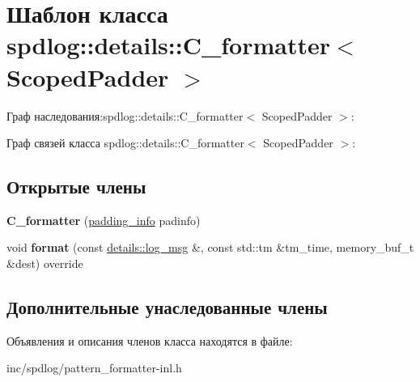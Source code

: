 \hypertarget{classspdlog_1_1details_1_1C__formatter}{}\section{Шаблон класса spdlog\+:\+:details\+:\+:C\+\_\+formatter$<$ Scoped\+Padder $>$}
\label{classspdlog_1_1details_1_1C__formatter}


Граф наследования\+:spdlog\+:\+:details\+:\+:C\+\_\+formatter$<$ Scoped\+Padder $>$\+:


Граф связей класса spdlog\+:\+:details\+:\+:C\+\_\+formatter$<$ Scoped\+Padder $>$\+:
\subsection*{Открытые члены}
\begin{DoxyCompactItemize}
\item 
\mbox{\label{classspdlog_1_1details_1_1C__formatter_a250be4952f5c2db04edda3e380d9bd1b}} 
{\bfseries C\+\_\+formatter} (\hyperlink{structspdlog_1_1details_1_1padding__info}{padding\+\_\+info} padinfo)
\item 
\mbox{\label{classspdlog_1_1details_1_1C__formatter_a0ada263f6e78da633eeb38ffa4681413}} 
void {\bfseries format} (const \hyperlink{structspdlog_1_1details_1_1log__msg}{details\+::log\+\_\+msg} \&, const std\+::tm \&tm\+\_\+time, memory\+\_\+buf\+\_\+t \&dest) override
\end{DoxyCompactItemize}
\subsection*{Дополнительные унаследованные члены}


Объявления и описания членов класса находятся в файле\+:\begin{DoxyCompactItemize}
\item 
inc/spdlog/pattern\+\_\+formatter-\/inl.\+h\end{DoxyCompactItemize}

